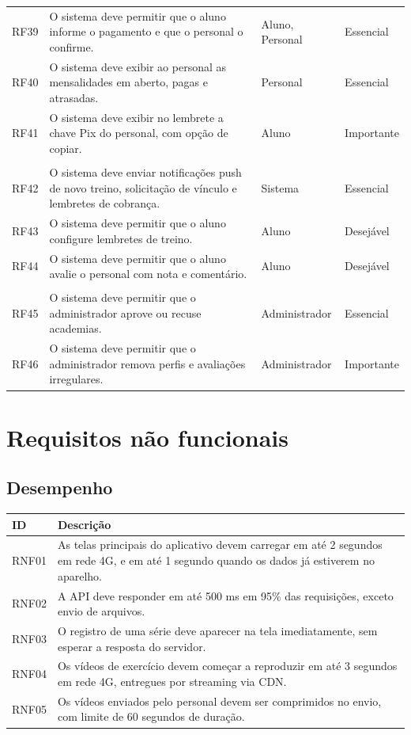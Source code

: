 \begin{longtable}{@{}>{\raggedright\arraybackslash}p{1.2cm} >{\raggedright\arraybackslash}p{7.6cm} >{\raggedright\arraybackslash}p{2.7cm} >{\raggedright\arraybackslash}p{2.4cm}@{}}
  RF39 & O sistema deve permitir que o aluno informe o pagamento e que o personal o confirme. & Aluno, Personal & Essencial \\
  RF40 & O sistema deve exibir ao personal as mensalidades em aberto, pagas e atrasadas. & Personal & Essencial \\
  RF41 & O sistema deve exibir no lembrete a chave Pix do personal, com opção de copiar. & Aluno & Importante \\
  \addlinespace
  \multicolumn{4}{@{}l}{\textbf{Notificações e avaliações}} \\
  RF42 & O sistema deve enviar notificações push de novo treino, solicitação de vínculo e lembretes de cobrança. & Sistema & Essencial \\
  RF43 & O sistema deve permitir que o aluno configure lembretes de treino. & Aluno & Desejável \\
  RF44 & O sistema deve permitir que o aluno avalie o personal com nota e comentário. & Aluno & Desejável \\
  \addlinespace
  \multicolumn{4}{@{}l}{\textbf{Administração}} \\
  RF45 & O sistema deve permitir que o administrador aprove ou recuse academias. & Administrador & Essencial \\
  RF46 & O sistema deve permitir que o administrador remova perfis e avaliações irregulares. & Administrador & Importante \\
\end{longtable}

\section{Requisitos não funcionais}

\subsection{Desempenho}
\begin{tabularx}{\textwidth}{@{}l L@{}}
  \toprule
  \textbf{ID} & \textbf{Descrição} \\
  \midrule
  RNF01 & As telas principais do aplicativo devem carregar em até 2 segundos em rede 4G, e em até 1 segundo quando os dados já estiverem no aparelho. \\
  RNF02 & A API deve responder em até 500 ms em 95\% das requisições, exceto envio de arquivos. \\
  RNF03 & O registro de uma série deve aparecer na tela imediatamente, sem esperar a resposta do servidor. \\
  RNF04 & Os vídeos de exercício devem começar a reproduzir em até 3 segundos em rede 4G, entregues por streaming via CDN. \\
  RNF05 & Os vídeos enviados pelo personal devem ser comprimidos no envio, com limite de 60 segundos de duração. \\
  \bottomrule
\end{tabularx}

